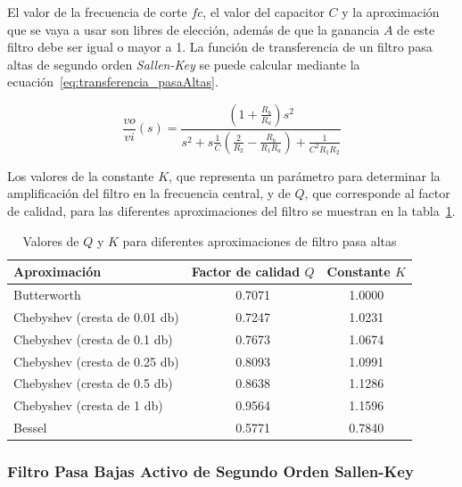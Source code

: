             El valor de la frecuencia de corte $fc$, el valor del capacitor $C$ y la aproximación que se vaya a usar son libres de elección,  además de que la ganancia $A$ de este filtro debe ser igual o mayor a 1. La función de transferencia de un filtro pasa altas de segundo orden \textit{Sallen-Key} se puede calcular mediante la ecuación~\ref{eq:transferencia_pasaAltas}.

            \begin{equation}
                \label{eq:transferencia_pasaAltas}
                \frac{vo}{vi}(s) = \frac{(1 + \frac{R_b}{R_a})s^2}{s^2 + s\frac{1}{C}(\frac{2}{R_2} - \frac{R_b}{R_1R_a}) + \frac{1}{C^2R_1R_2}}
            \end{equation}

            Los valores de la constante $K$, que representa un parámetro para determinar la amplificación del filtro en la frecuencia central, y de $Q$, que corresponde al factor de calidad, para las diferentes aproximaciones del filtro se muestran en la tabla~\ref{tab:valores_filtro_pasa_altas}.
                
            \begin{table}[H]
                \centering
                \begin{tabular}{ l | c | c }
                    Aproximación & Factor de calidad $Q$ & Constante $K$ \\ \hline
                    Butterworth & 0.7071 & 1.0000 \\
                    Chebyshev (cresta de 0.01 db) & 0.7247 & 1.0231 \\
                    Chebyshev (cresta de 0.1 db) & 0.7673 & 1.0674 \\
                    Chebyshev (cresta de 0.25 db) & 0.8093 & 1.0991\\
                    Chebyshev (cresta de 0.5 db) & 0.8638 & 1.1286\\
                    Chebyshev (cresta de 1 db) & 0.9564 & 1.1596\\
                    Bessel & 0.5771 & 0.7840\\
                \end{tabular}
                \caption{Valores de $Q$ y $K$ para diferentes aproximaciones de filtro pasa altas}
                \label{tab:valores_filtro_pasa_altas}
            \end{table}

        \subsubsection{Filtro Pasa Bajas Activo de Segundo Orden Sallen-Key}

